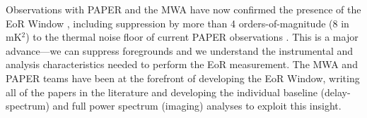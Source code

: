 \documentclass[preprint]{aastex}
\begin{document}
Observations with PAPER and the MWA have now confirmed the presence of the EoR Window
\citep{pober_et_al2013,dillon_et_al2013b_trunc}, including suppression by more than 4
orders-of-magnitude (8 in mK$^{2}$) to the thermal noise floor of current
PAPER observations \citep{parsons_et_al2013}. This is a major advance---we can
suppress foregrounds and we understand the instrumental and analysis
characteristics needed to perform the EoR measurement. The MWA and PAPER teams
have been at the forefront of developing the EoR Window, writing all of the
papers in the literature and developing the individual baseline
(delay-spectrum) and full power spectrum (imaging) analyses to exploit this
insight. 

\end{document}
